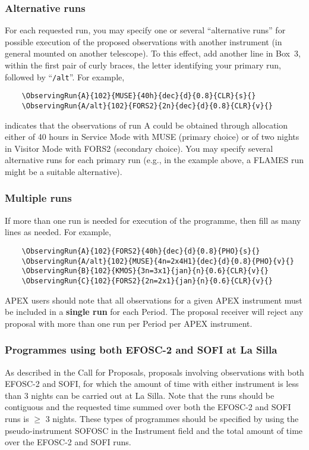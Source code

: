 \documentclass{article}
\begin{document}
\subsubsection*{Alternative runs}
For each requested run, you may specify one or several
``alternative runs'' for possible execution of the proposed
observations with another instrument (in general mounted on another
telescope). To this effect, add another line in Box~3, within the
first pair of curly braces, the letter identifying your primary run,
followed by ``\verb|/alt|''. For example,
\begin{verbatim}
    \ObservingRun{A}{102}{MUSE}{40h}{dec}{d}{0.8}{CLR}{s}{}
    \ObservingRun{A/alt}{102}{FORS2}{2n}{dec}{d}{0.8}{CLR}{v}{}
\end{verbatim}
indicates that the observations of run A could be obtained
through allocation either of 40 hours in Service Mode with MUSE
(primary choice) or of two nights in Visitor Mode with FORS2 (secondary
choice). You may specify several alternative runs for each primary run
(e.g., in the example above, a FLAMES run might be a suitable alternative).

\subsubsection*{Multiple runs}
If more than one run is needed for execution of
the programme, then fill as many lines as needed.  For example,
\begin{verbatim} 
    \ObservingRun{A}{102}{FORS2}{40h}{dec}{d}{0.8}{PHO}{s}{}
    \ObservingRun{A/alt}{102}{MUSE}{4n=2x4H1}{dec}{d}{0.8}{PHO}{v}{}
    \ObservingRun{B}{102}{KMOS}{3n=3x1}{jan}{n}{0.6}{CLR}{v}{}
    \ObservingRun{C}{102}{FORS2}{2n=2x1}{jan}{n}{0.6}{CLR}{v}{}
\end{verbatim}

APEX users should note that all observations for a given APEX
instrument must be included in a {\bf single run} for each Period. The proposal
receiver will reject any proposal with more than one run per Period per APEX instrument. 

\subsubsection*{Programmes using both EFOSC-2 and SOFI at La Silla}
\label{sec:sofiefosc}

As described in the Call for Proposals,
proposals involving observations with both EFOSC-2 and SOFI,
for which the amount of time with either instrument is less than
3 nights can be carried out at La Silla.
Note that the runs should be contiguous and the requested time
summed over both the EFOSC-2 and SOFI runs is $\ge$ 3 nights.
These types of programmes should be specified
by using the pseudo-instrument SOFOSC in the Instrument field and
the total amount of time over the EFOSC-2 and SOFI runs.
\end{document}
